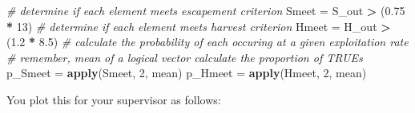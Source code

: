\documentclass[]{book}
\newenvironment{Shaded}{\begin{snugshade}}{\end{snugshade}}
\newcommand{\CommentTok}[1]{\textcolor[rgb]{0.56,0.35,0.01}{\textit{#1}}}
\newcommand{\DecValTok}[1]{\textcolor[rgb]{0.00,0.00,0.81}{#1}}
\newcommand{\FloatTok}[1]{\textcolor[rgb]{0.00,0.00,0.81}{#1}}
\newcommand{\KeywordTok}[1]{\textcolor[rgb]{0.13,0.29,0.53}{\textbf{#1}}}
\newcommand{\NormalTok}[1]{#1}
\newcommand{\OperatorTok}[1]{\textcolor[rgb]{0.81,0.36,0.00}{\textbf{#1}}}
\newcommand{\StringTok}[1]{\textcolor[rgb]{0.31,0.60,0.02}{#1}}
\begin{document}
\begin{Shaded}
\begin{Highlighting}[]
\CommentTok{# determine if each element meets escapement criterion}
\NormalTok{Smeet =}\StringTok{ }\NormalTok{S_out }\OperatorTok{>}\StringTok{ }\NormalTok{(}\FloatTok{0.75} \OperatorTok{*}\StringTok{ }\DecValTok{13}\NormalTok{)}
\CommentTok{# determine if each element meets harvest criterion}
\NormalTok{Hmeet =}\StringTok{ }\NormalTok{H_out }\OperatorTok{>}\StringTok{ }\NormalTok{(}\FloatTok{1.2} \OperatorTok{*}\StringTok{ }\FloatTok{8.5}\NormalTok{)}
\CommentTok{# calculate the probability of each occuring at a given exploitation rate}
  \CommentTok{# remember, mean of a logical vector calculate the proportion of TRUEs}
\NormalTok{p_Smeet =}\StringTok{ }\KeywordTok{apply}\NormalTok{(Smeet, }\DecValTok{2}\NormalTok{, mean)}
\NormalTok{p_Hmeet =}\StringTok{ }\KeywordTok{apply}\NormalTok{(Hmeet, }\DecValTok{2}\NormalTok{, mean)}
\end{Highlighting}
\end{Shaded}

You plot this for your supervisor as follows:
\end{document}
